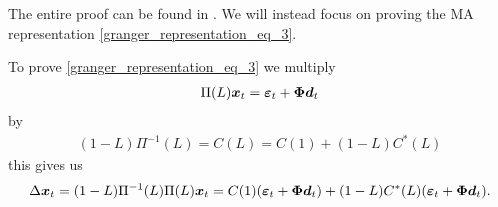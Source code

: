 \noindent The entire proof can be found in \cite{co-Integration_and_error_correction}. We will instead focus on proving the MA representation \eqref{granger_representation_eq_3}.
\begin{bevis}
    To prove \eqref{granger_representation_eq_3} we multiply 
    \begin{align*}
        \Pi(L)\boldsymbol{x}_t=\boldsymbol{\varepsilon}_t + \boldsymbol{\Phi} \boldsymbol{d}_t
    \end{align*}
    by
    \begin{align*}
        (1-L)\Pi^{-1}(L)=C(L)=C(1)+(1-L)C^\ast(L)
    \end{align*}
    this gives us
    \begin{align*}
        \Delta \boldsymbol{x}_t= (1-L)\Pi^{-1}(L)\Pi(L)\boldsymbol{x}_t=C(1)(\boldsymbol{\varepsilon}_t+\boldsymbol{\Phi} \boldsymbol{d}_t)+(1-L) C^\ast(L)(\boldsymbol{\varepsilon}_t+\boldsymbol{\Phi} \boldsymbol{d}_t).
    \end{align*}


\end{bevis}
